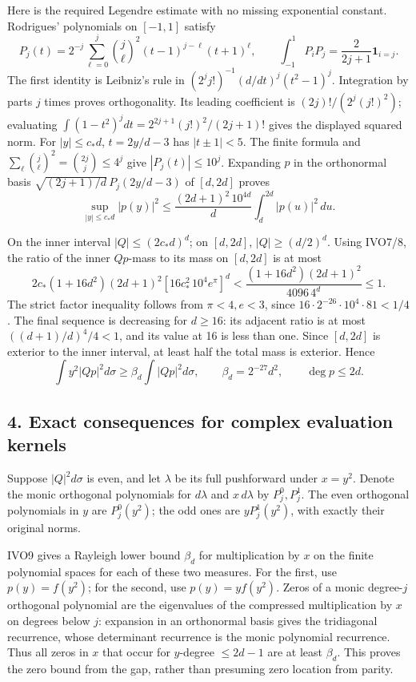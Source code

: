 \documentclass[11pt]{article}
\begin{document}
Here is the required Legendre estimate with no missing exponential constant. Rodrigues' polynomials on \([-1,1]\) satisfy \[
P_j(t)=2^{-j}\sum_{\ell=0}^j\binom j\ell^2(t-1)^{j-\ell}(t+1)^\ell,\qquad
\int_{-1}^1P_iP_j=\frac2{2j+1}\mathbf1_{i=j}.
\] The first identity is Leibniz's rule in \((2^jj!)^{-1}(d/dt)^j(t^2-1)^j\). Integration by parts \(j\) times proves orthogonality. Its leading coefficient is \((2j)!/(2^j(j!)^2)\); evaluating \(\int(1-t^2)^jdt=2^{2j+1}(j!)^2/(2j+1)!\) gives the displayed squared norm. For \(|y|\le c_*d\), \(t=2y/d-3\) has \(|t\pm1|<5\). The finite formula and \(\sum_\ell\binom j\ell^2=\binom{2j}j\le4^j\) give \(|P_j(t)|\le10^j\). Expanding \(p\) in the orthonormal basis \(\sqrt{(2j+1)/d}\,P_j(2y/d-3)\) of \([d,2d]\) proves \[
\sup_{|y|\le c_*d}|p(y)|^2
\le\frac{(2d+1)^2\,10^{4d}}d\int_d^{2d}|p(u)|^2\,du.
\tag{IVO8}
\]

On the inner interval \(|Q|\le(2c_*d)^d\); on \([d,2d]\), \(|Q|\ge(d/2)^d\). Using IVO7/8, the ratio of the inner \(Qp\)-mass to its mass on \([d,2d]\) is at most \[
2c_*(1+16d^2)(2d+1)^2
[16c_*^2\,10^4e^\pi]^d
<\frac{(1+16d^2)(2d+1)^2}{4096\,4^d}\le1.
\] The strict factor inequality follows from \(\pi<4,e<3\), since \(16\cdot2^{-26}\cdot10^4\cdot81<1/4\). The final sequence is decreasing for \(d\ge16\): its adjacent ratio is at most \(((d+1)/d)^4/4<1\), and its value at 16 is less than one. Since \([d,2d]\) is exterior to the inner interval, at least half the total mass is exterior. Hence \[
\int y^2|Qp|^2d\sigma\ge\beta_d\int|Qp|^2d\sigma,\qquad
\beta_d=2^{-27}d^2,\qquad\deg p\le2d.
\tag{IVO9}
\]

\subsection{4. Exact consequences for complex evaluation kernels}\label{exact-consequences-for-complex-evaluation-kernels}

Suppose \(|Q|^2d\sigma\) is even, and let \(\lambda\) be its full pushforward under \(x=y^2\). Denote the monic orthogonal polynomials for \(d\lambda\) and \(x\,d\lambda\) by \(P_j^0,P_j^1\). The even orthogonal polynomials in \(y\) are \(P_j^0(y^2)\); the odd ones are \(yP_j^1(y^2)\), with exactly their original norms.

IVO9 gives a Rayleigh lower bound \(\beta_d\) for multiplication by \(x\) on the finite polynomial spaces for each of these two measures. For the first, use \(p(y)=f(y^2)\); for the second, use \(p(y)=yf(y^2)\). Zeros of a monic degree-\(j\) orthogonal polynomial are the eigenvalues of the compressed multiplication by \(x\) on degrees below \(j\): expansion in an orthonormal basis gives the tridiagonal recurrence, whose determinant recurrence is the monic polynomial recurrence. Thus all zeros in \(x\) that occur for \(y\)-degree \(\le2d-1\) are at least \(\beta_d\). This proves the zero bound from the gap, rather than presuming zero location from parity.
\end{document}
